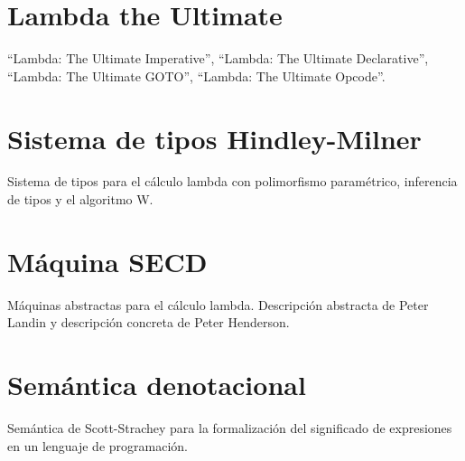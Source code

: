 \section{Lambda the Ultimate}

``Lambda: The Ultimate Imperative'', ``Lambda: The Ultimate Declarative'',
``Lambda: The Ultimate GOTO'', ``Lambda: The Ultimate Opcode''.

\section{Sistema de tipos Hindley-Milner}

Sistema de tipos para el cálculo lambda con polimorfismo paramétrico, inferencia
de tipos y el algoritmo W.

\section{Máquina SECD}

Máquinas abstractas para el cálculo lambda. Descripción abstracta de Peter
Landin y descripción concreta de Peter Henderson.

\section{Semántica denotacional}

Semántica de Scott-Strachey para la formalización del significado de expresiones
en un lenguaje de programación.


